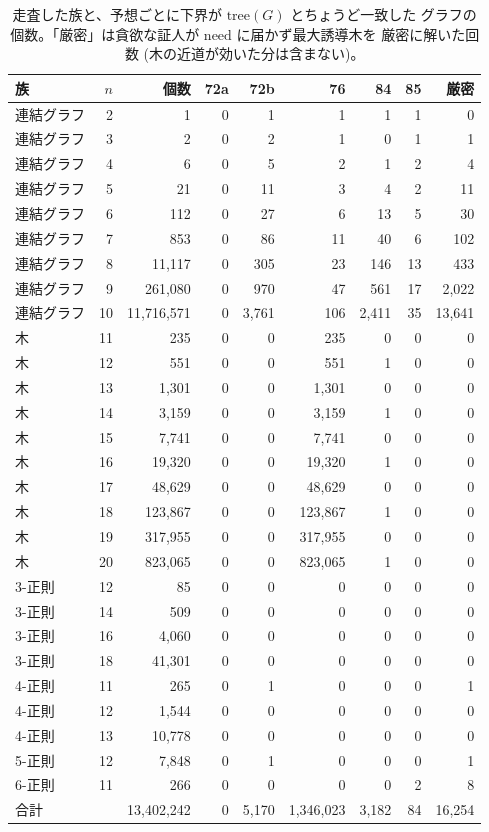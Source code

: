 \documentclass[paper=a4,fontsize=10.5pt,jafontsize=10.5pt]{jlreq}
\theoremstyle{plain}
\theoremstyle{definition}
\begin{document}
\begin{table}[htbp]
\centering
\small
\caption{走査した族と、予想ごとに下界が $\mathrm{tree}(G)$ とちょうど一致した
グラフの個数。「厳密」は貪欲な証人が $\mathrm{need}$ に届かず最大誘導木を
厳密に解いた回数 (木の近道が効いた分は含まない)。}
\label{tab:fams}
\begin{tabular}{lrrrrrrrr}
\toprule
族 & $n$ & 個数 & 72a & 72b & 76 & 84 & 85 & 厳密 \\
\midrule
連結グラフ & 2 & 1 & 0 & 1 & 1 & 1 & 1 & 0 \\
連結グラフ & 3 & 2 & 0 & 2 & 1 & 0 & 1 & 1 \\
連結グラフ & 4 & 6 & 0 & 5 & 2 & 1 & 2 & 4 \\
連結グラフ & 5 & 21 & 0 & 11 & 3 & 4 & 2 & 11 \\
連結グラフ & 6 & 112 & 0 & 27 & 6 & 13 & 5 & 30 \\
連結グラフ & 7 & 853 & 0 & 86 & 11 & 40 & 6 & 102 \\
連結グラフ & 8 & 11,117 & 0 & 305 & 23 & 146 & 13 & 433 \\
連結グラフ & 9 & 261,080 & 0 & 970 & 47 & 561 & 17 & 2,022 \\
連結グラフ & 10 & 11,716,571 & 0 & 3,761 & 106 & 2,411 & 35 & 13,641 \\
木 & 11 & 235 & 0 & 0 & 235 & 0 & 0 & 0 \\
木 & 12 & 551 & 0 & 0 & 551 & 1 & 0 & 0 \\
木 & 13 & 1,301 & 0 & 0 & 1,301 & 0 & 0 & 0 \\
木 & 14 & 3,159 & 0 & 0 & 3,159 & 1 & 0 & 0 \\
木 & 15 & 7,741 & 0 & 0 & 7,741 & 0 & 0 & 0 \\
木 & 16 & 19,320 & 0 & 0 & 19,320 & 1 & 0 & 0 \\
木 & 17 & 48,629 & 0 & 0 & 48,629 & 0 & 0 & 0 \\
木 & 18 & 123,867 & 0 & 0 & 123,867 & 1 & 0 & 0 \\
木 & 19 & 317,955 & 0 & 0 & 317,955 & 0 & 0 & 0 \\
木 & 20 & 823,065 & 0 & 0 & 823,065 & 1 & 0 & 0 \\
3-正則 & 12 & 85 & 0 & 0 & 0 & 0 & 0 & 0 \\
3-正則 & 14 & 509 & 0 & 0 & 0 & 0 & 0 & 0 \\
3-正則 & 16 & 4,060 & 0 & 0 & 0 & 0 & 0 & 0 \\
3-正則 & 18 & 41,301 & 0 & 0 & 0 & 0 & 0 & 0 \\
4-正則 & 11 & 265 & 0 & 1 & 0 & 0 & 0 & 1 \\
4-正則 & 12 & 1,544 & 0 & 0 & 0 & 0 & 0 & 0 \\
4-正則 & 13 & 10,778 & 0 & 0 & 0 & 0 & 0 & 0 \\
5-正則 & 12 & 7,848 & 0 & 1 & 0 & 0 & 0 & 1 \\
6-正則 & 11 & 266 & 0 & 0 & 0 & 0 & 2 & 8 \\
\midrule
\multicolumn{2}{l}{合計} & 13,402,242 & 0
& 5,170 & 1,346,023 & 3,182 & 84
& 16,254 \\
\bottomrule
\end{tabular}
\end{table}
\end{document}
